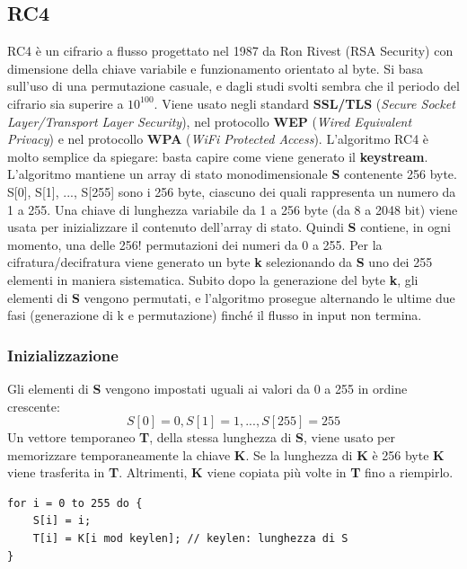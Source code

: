 \subsection{RC4}
RC4 è un cifrario a flusso progettato nel 1987 da Ron Rivest (RSA Security) con dimensione della chiave variabile e funzionamento orientato al byte. Si basa sull'uso di una permutazione casuale, e dagli studi svolti sembra che il periodo del cifrario sia superire a $10^{100}$. Viene usato negli standard \textbf{SSL/TLS} (\textit{Secure Socket Layer/Transport Layer Security}), nel protocollo \textbf{WEP} (\textit{Wired Equivalent Privacy}) e nel protocollo \textbf{WPA} (\textit{WiFi Protected Access}). L'algoritmo RC4 è molto semplice da spiegare: basta capire come viene generato il
\textbf{keystream}. \\

L’algoritmo mantiene un array di stato monodimensionale \textbf{S} contenente 256 byte. S[0], S[1], ..., S[255] sono i 256 byte, ciascuno dei quali rappresenta un numero da 1 a 255. Una chiave di lunghezza variabile da 1 a 256 byte (da 8 a 2048 bit) viene usata per inizializzare il contenuto dell'array di stato. Quindi \textbf{S} contiene, in ogni momento, una delle 256! permutazioni dei numeri da 0 a 255. Per la cifratura/decifratura viene generato un byte \textbf{k} selezionando da \textbf{S} uno dei 255 elementi in maniera sistematica. Subito dopo la generazione del byte \textbf{k}, gli elementi di \textbf{S} vengono permutati, e l'algoritmo prosegue alternando le ultime due fasi (generazione di k e permutazione) finché il flusso in input non termina.\\

\subsubsection{Inizializzazione}
Gli elementi di \textbf{S} vengono impostati uguali ai valori da 0 a 255 in ordine crescente:
\begin{equation}
	S[0] = 0, S[1] = 1, ..., S[255] = 255
\end{equation}
Un vettore temporaneo \textbf{T}, della stessa lunghezza di \textbf{S}, viene usato per memorizzare temporaneamente la chiave \textbf{K}. Se la lunghezza di \textbf{K} è 256 byte \textbf{K} viene trasferita in \textbf{T}. Altrimenti, \textbf{K} viene copiata più volte in \textbf{T} fino a riempirlo.

\begin{algorithm}
\begin{lstlisting}[caption={Inizializzazione RC4}]
for i = 0 to 255 do {
	S[i] = i;
	T[i] = K[i mod keylen]; // keylen: lunghezza di S
}
\end{lstlisting}
\end{algorithm}


